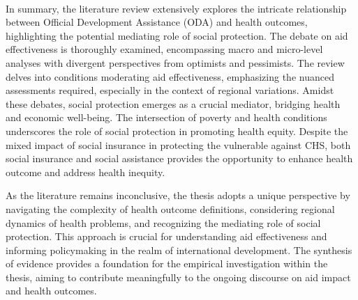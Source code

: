 \paragraph{} In summary, the literature review extensively explores the intricate relationship between Official Development Assistance (ODA) and health outcomes, highlighting the potential mediating role of social protection. The debate on aid effectiveness is thoroughly examined, encompassing macro and micro-level analyses with divergent perspectives from optimists and pessimists. The review delves into conditions moderating aid effectiveness, emphasizing the nuanced assessments required, especially in the context of regional variations. Amidst these debates, social protection emerges as a crucial mediator, bridging health and economic well-being. The intersection of poverty and health conditions underscores the role of social protection in promoting health equity. Despite the mixed impact of social insurance in protecting the vulnerable against CHS, both social insurance and social assistance provides the opportunity to enhance health outcome and address health inequity.

As the literature remains inconclusive, the thesis adopts a unique perspective by navigating the complexity of health outcome definitions, considering regional dynamics of health problems, and recognizing the mediating role of social protection. This approach is crucial for understanding aid effectiveness and informing policymaking in the realm of international development. The synthesis of evidence provides a foundation for the empirical investigation within the thesis, aiming to contribute meaningfully to the ongoing discourse on aid impact and health outcomes.